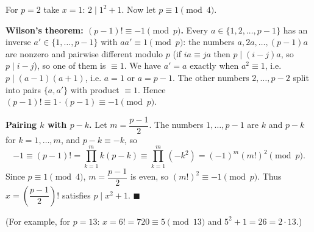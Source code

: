 For $p=2$ take $x=1$: $2\mid1^2+1$. Now let $p\equiv1\pmod4$.

\textbf{Wilson's theorem: $(p-1)!\equiv-1\pmod p$.} Every $a\in\{1,2,\dots,p-1\}$ has an inverse $a'\in\{1,\dots,p-1\}$ with $aa'\equiv1\pmod p$: the numbers $a,2a,\dots,(p-1)a$ are nonzero and pairwise different modulo $p$ (if $ia\equiv ja$ then $p\mid(i-j)a$, so $p\mid i-j$), so one of them is $\equiv1$. We have $a'=a$ exactly when $a^2\equiv1$, i.e. $p\mid(a-1)(a+1)$, i.e. $a=1$ or $a=p-1$. The other numbers $2,\dots,p-2$ split into pairs $\{a,a'\}$ with product $\equiv1$. Hence $(p-1)!\equiv1\cdot(p-1)\equiv-1\pmod p$.

\textbf{Pairing $k$ with $p-k$.} Let $m=\dfrac{p-1}{2}$. The numbers $1,\dots,p-1$ are $k$ and $p-k$ for $k=1,\dots,m$, and $p-k\equiv-k$, so
\[-1\equiv(p-1)!=\prod_{k=1}^{m}k(p-k)\equiv\prod_{k=1}^{m}\left(-k^2\right)=(-1)^m\left(m!\right)^2\pmod p.\]
Since $p\equiv1\pmod4$, $m=\dfrac{p-1}{2}$ is even, so $(m!)^2\equiv-1\pmod p$. Thus $x=\left(\dfrac{p-1}{2}\right)!$ satisfies $p\mid x^2+1$. $\blacksquare$

(For example, for $p=13$: $x=6!=720\equiv5\pmod{13}$ and $5^2+1=26=2\cdot13$.)
